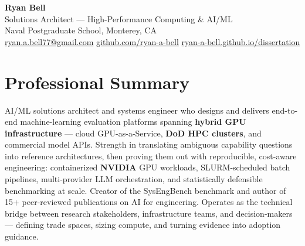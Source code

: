 \documentclass[10pt,letterpaper]{article}
\begin{document}
\begin{center}
  {\Huge\bfseries\color{npsnavy} Ryan Bell}\\[3pt]
  {\large Solutions Architect --- High-Performance Computing \& AI/ML}\\[3pt]
  {\small Naval Postgraduate School, Monterey, CA}\\[2pt]
  {\small
    \href{mailto:ryan.a.bell77@gmail.com}{ryan.a.bell77@gmail.com} \quad\textbullet\quad
    \href{https://github.com/ryan-a-bell}{github.com/ryan-a-bell} \quad\textbullet\quad
    \href{https://ryan-a-bell.github.io/dissertation/}{ryan-a-bell.github.io/dissertation}
  }
\end{center}

\section{Professional Summary}
AI/ML solutions architect and systems engineer who designs and delivers end-to-end
machine-learning evaluation platforms spanning \textbf{hybrid GPU infrastructure} --- cloud
GPU-as-a-Service, \textbf{DoD HPC clusters}, and commercial model APIs. Strength in translating
ambiguous capability questions into reference architectures, then proving them out with
reproducible, cost-aware engineering: containerized \textbf{NVIDIA} GPU workloads,
SLURM-scheduled batch pipelines, multi-provider LLM orchestration, and statistically
defensible benchmarking at scale. Creator of the SysEngBench benchmark and author of 15+
peer-reviewed publications on AI for engineering. Operates as the technical bridge between
research stakeholders, infrastructure teams, and decision-makers --- defining trade spaces,
sizing compute, and turning evidence into adoption guidance.

\end{document}
